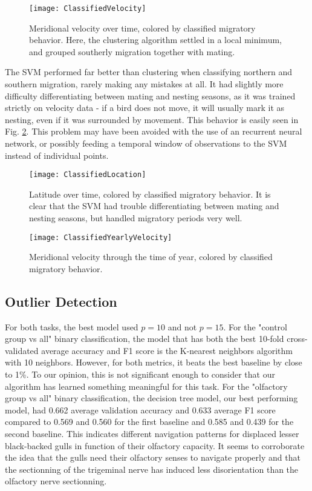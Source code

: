 \documentclass[letterpaper, 10pt, conference]{ieeeconf}  %
\begin{document}
	\begin{figure}[h!]
	\centering
	\texttt{[image: ClassifiedVelocity]}
	\caption{Meridional velocity over time, colored by classified migratory behavior. Here, the clustering algorithm settled in a local minimum, and grouped southerly migration together with mating.}
    \label{fig:clvel}
	\end{figure}
    
    The SVM performed far better than clustering when classifying northern and southern migration, rarely making any mistakes at all. It had slightly more difficulty differentiating between mating and nesting seasons, as it was trained strictly on velocity data - if a bird does not move, it will usually mark it as nesting, even if it was surrounded by movement. This behavior is easily seen in Fig. \ref{fig:clloc}. This problem may have been avoided with the use of an recurrent neural network, or possibly feeding a temporal window of observations to the SVM instead of individual points.
    
	\begin{figure}[h!]
	\centering
	\texttt{[image: ClassifiedLocation]}
	\caption{Latitude over time, colored by classified migratory behavior. It is clear that the SVM had trouble differentiating between mating and nesting seasons, but handled migratory periods very well.}
    \label{fig:clloc}
	\end{figure}
    
	\begin{figure}[h!]
	\centering
	\texttt{[image: ClassifiedYearlyVelocity]}
	\caption{Meridional velocity through the time of year, colored by classified migratory behavior.}
    \label{fig:clvely}
	\end{figure}

\subsection{Outlier Detection}
	For both tasks, the best model used $p=10$ and not $p=15$. For the "control group vs all" binary classification, the model that has both the best 10-fold cross-validated average accuracy and F1 score is the K-nearest neighbors algorithm with 10 neighbors. However, for both metrics, it beats the best baseline by close to 1\%. To our opinion, this is not significant enough to consider that our algorithm has learned something meaningful for this task. For the "olfactory group vs all" binary classification, the decision tree model, our best performing model, had 0.662 average validation accuracy and 0.633 average F1 score compared to 0.569 and 0.560 for the first baseline and 0.585 and 0.439 for the second baseline. This indicates different navigation patterns for displaced lesser black-backed gulls in function of their olfactory capacity. It seems to corroborate the idea that the gulls need their olfactory senses to navigate properly and that the sectionning of the trigeminal nerve has induced less disorientation than the olfactory nerve sectionning.
\end{document}
